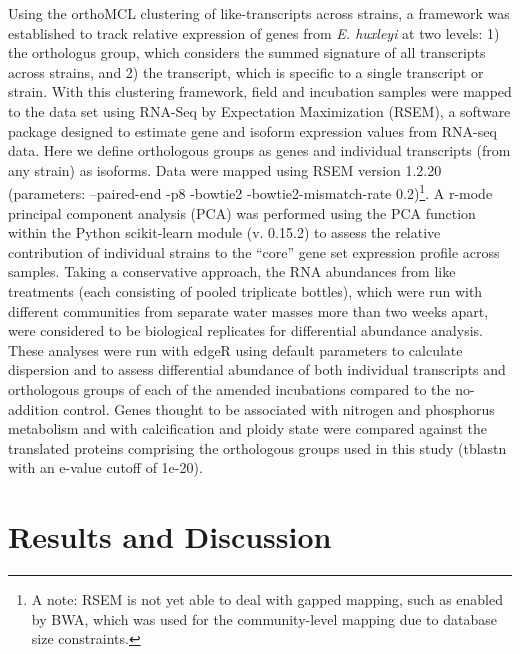 Using the orthoMCL clustering of like-transcripts across strains, a framework was established to track relative expression of genes from \textit{E. huxleyi} at two levels: 1) the orthologus group, which considers the summed signature of all transcripts across strains, and 2) the transcript, which is specific to a single transcript or strain. With this clustering framework, field and incubation samples were mapped to the data set using RNA-Seq by Expectation Maximization (RSEM), a software package designed to estimate gene and isoform expression values from RNA-seq data. Here we define orthologous groups as genes and individual transcripts (from any strain) as isoforms. Data were mapped using RSEM version 1.2.20 (parameters: --paired-end -p8 -bowtie2 -bowtie2-mismatch-rate 0.2)\footnote{A note: RSEM is not yet able to deal with gapped mapping, such as enabled by BWA, which was used for the community-level mapping due to database size constraints.}. A r-mode principal component analysis (PCA) was performed using the PCA function within the Python scikit-learn module (v. 0.15.2) to assess the relative contribution of individual strains to the ``core'' gene set expression profile across samples. Taking a conservative approach, the RNA abundances from like treatments (each consisting of pooled triplicate bottles), which were run with different communities from separate water masses more than two weeks apart, were considered to be biological replicates for differential abundance analysis. These analyses were run with edgeR using default parameters to calculate dispersion and to assess differential abundance of both individual transcripts and orthologous groups of each of the amended incubations compared to the no-addition control. Genes thought to be associated with nitrogen and phosphorus metabolism \citep{Dyhrman2006, Rokitta2014, McKew2015} and with calcification and ploidy state \citep{VonDassow2009, Mackinder2011, Frada2012} were compared against the translated proteins comprising the orthologous groups used in this study (tblastn with an e-value cutoff of 1e-20).\par



\section{Results and Discussion}

